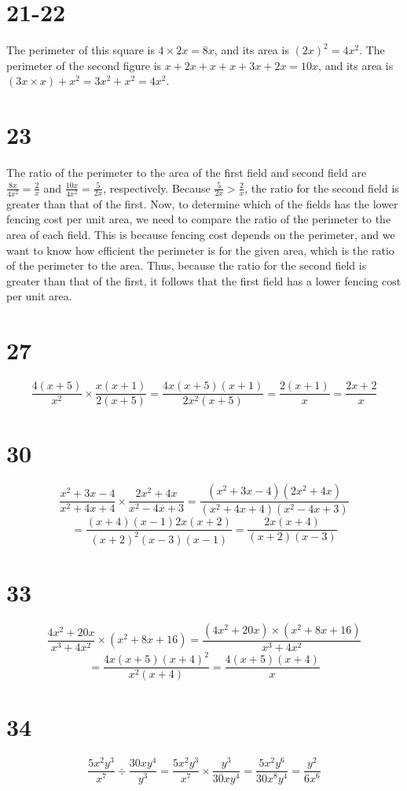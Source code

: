 \documentclass{article}
\theoremstyle{definition}
\newcommand{\?}{\stackrel{?}{=}}
\begin{document}
\section*{21-22}
The perimeter of this square is $4\times 2x=8x$, and its area is $(2x)^2=4x^2$. The perimeter of the second figure is $x+2x+x+x+3x+2x=10x$, and its area is 
$(3x\times x)+x^2=3x^2+x^2=4x^2$. 

\section*{23}
The ratio of the perimeter to the area of the first field and second field are $\frac{8x}{4x^2}=\frac{2}{x}$ and
$\frac{10x}{4x^2}=\frac{5}{2x}$, respectively. Because $\frac{5}{2x}>\frac{2}{x}$, the ratio for the second field is greater than that of the first. Now, 
to determine which of the fields has the lower fencing cost per unit area, we need to compare the ratio of the perimeter to the area of each field. This is because 
fencing cost depends on the perimeter, and we want to know how efficient the perimeter is for the given area, which is the ratio of the perimeter to the area. Thus, because 
the ratio for the second field is greater than that of the first, it follows that the first field has a lower fencing cost per unit area.

\section*{27}
\[ \frac{4(x+5)}{x^2}\times\frac{x(x+1)}{2(x+5)}=\frac{4x(x+5)(x+1)}{2x^2(x+5)}=\frac{2(x+1)}{x}=\frac{2x+2}{x} \]

\section*{30}
\[ \frac{x^2+3x-4}{x^2+4x+4}\times\frac{2x^2+4x}{x^2-4x+3}=\frac{(x^2+3x-4)(2x^2+4x)}{(x^2+4x+4)(x^2-4x+3)} \]
\[ =\frac{(x+4)(x-1)2x(x+2)}{(x+2)^2(x-3)(x-1)}=\frac{2x(x+4)}{(x+2)(x-3)} \]

\section*{33}
\[ \frac{4x^2+20x}{x^3+4x^2}\times (x^2+8x+16)=\frac{(4x^2+20x)\times (x^2+8x+16)}{x^3+4x^2} \]
\[ =\frac{4x(x+5)(x+4)^2}{x^2(x+4)}=\frac{4(x+5)(x+4)}{x} \]

\section*{34}
\[ \frac{5x^2y^3}{x^7}\div\frac{30xy^4}{y^3}=\frac{5x^2y^3}{x^7}\times\frac{y^3}{30xy^4}=\frac{5x^2y^6}{30x^8y^4}=\frac{y^2}{6x^6} \]
\end{document}
